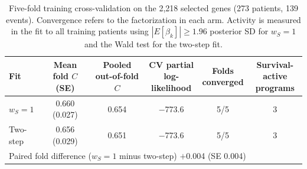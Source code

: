 \begin{table}[!htb]
\centering
\small
\begin{tabular}{lccccc}
\toprule
Fit & \shortstack{Mean fold $C$\\(SE)} & \shortstack{Pooled\\out-of-fold $C$} & \shortstack{CV partial\\log-likelihood} & \shortstack{Folds\\converged} & \shortstack{Survival-active\\programs} \\
\midrule
$w_S = 1$ & 0.660 (0.027) & 0.654 & $-$773.6 & 5/5 & 3 \\
Two-step & 0.656 (0.029) & 0.651 & $-$773.6 & 5/5 & 3 \\
\midrule
\multicolumn{6}{l}{Paired fold difference ($w_S = 1$ minus two-step) \quad $+$0.004 (SE 0.004)} \\
\bottomrule
\end{tabular}
\caption{Five-fold training cross-validation on the 2,218 selected genes (273 patients, 139 events). Convergence refers to the factorization in each arm. Activity is measured in the fit to all training patients using $|E[\beta_k]| \geq 1.96$ posterior SD for $w_S = 1$ and the Wald test for the two-step fit.}
\label{tab:training-cv}
\end{table}

